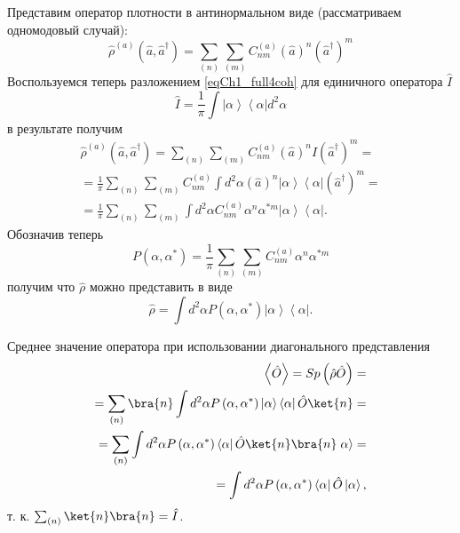Представим оператор плотности в
антинормальном виде (рассматриваем одномодовый случай): 
\begin{equation}
\hat{\rho}^{\left(a\right)}\left(\hat{a},\hat{a}^{\dag}\right) = 
\sum_{(n)}\sum_{(m)}C^{\left(a\right)}_{nm}\left(\hat{a}\right)^n\left(\hat{a}^{\dag}\right)^m
\end{equation}
Воспользуемся теперь разложением \eqref{eqCh1_full4coh} для единичного
оператора $\hat{I}$
\[
\hat{I} = \frac{1}{\pi}\int \left|\alpha\right>\left<\alpha\right| d^2 \alpha
\]
в результате получим
\begin{eqnarray}
\hat{\rho}^{\left(a\right)}\left(\hat{a},\hat{a}^{\dag}\right) = 
\sum_{(n)}\sum_{(m)}C^{\left(a\right)}_{nm}\left(\hat{a}\right)^n\hat{I}\left(\hat{a}^{\dag}\right)^m
= 
\nonumber \\
= \frac{1}{\pi}\sum_{(n)}\sum_{(m)}C^{\left(a\right)}_{nm}\int d^2 \alpha
\left(\hat{a}\right)^n
\left|\alpha\right>\left<\alpha\right|
\left(\hat{a}^{\dag}\right)^m = 
\nonumber \\
= \frac{1}{\pi}\sum_{(n)}\sum_{(m)}\int d^2 \alpha
C^{\left(a\right)}_{nm}
\alpha^n
\alpha^{*m}
\left|\alpha\right>\left<\alpha\right|.
\end{eqnarray}
Обозначив теперь 
\[
P\left(\alpha, \alpha^{*}\right) = \frac{1}{\pi}\sum_{(n)}\sum_{(m)}
C^{\left(a\right)}_{nm}
\alpha^n
\alpha^{*m}
\]
получим что $\hat{\rho}$ можно представить в виде
\begin{equation}
\hat{\rho} = \int d^2 \alpha P\left(\alpha, \alpha^{*}\right) 
\left|\alpha\right>\left<\alpha\right|.
\label{eqCh1_Rho_in_alpha}
\end{equation}

Среднее значение оператора при использовании
диагонального представления 
\begin{eqnarray}
\left<\hat{O}\right> = Sp \left(\hat{\rho}\hat{O}\right) =
\nonumber \\
= \sum_{(n)}\bra{n}
\int d^2 \alpha P\left(\alpha, \alpha^{*}\right) 
\left|\alpha\right>\left<\alpha\right|
\hat{O}\ket{n} =
\nonumber \\
= \sum_{(n)} \int d^2 \alpha P\left(\alpha, \alpha^{*}\right)
\left<\alpha\right|\hat{O}\ket{n}
\bra{n}\left.\alpha\right> = 
\nonumber \\
=  
\int d^2 \alpha P\left(\alpha, \alpha^{*}\right)
\left<\alpha\right|\hat{O}\left|\alpha\right>,
\label{eqCh1_middleO}
\end{eqnarray}
т. к. $\sum_{(n)}\ket{n}\bra{n} = \hat{I}$. 

